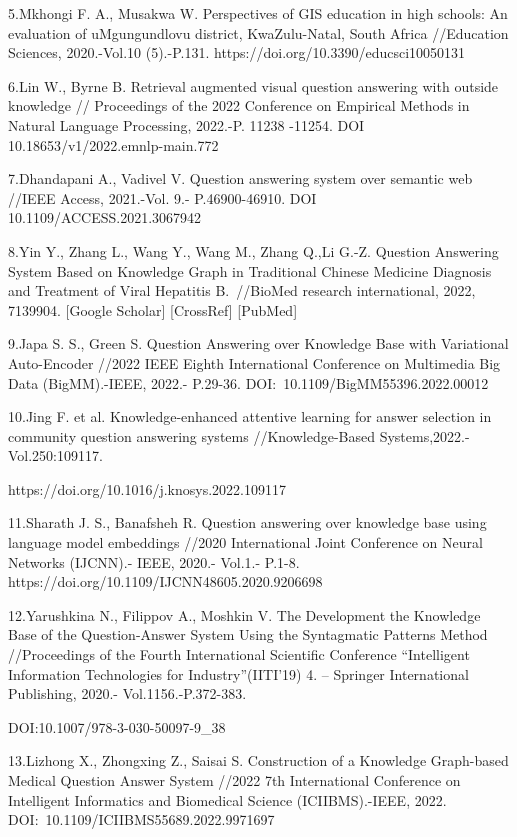 5.Mkhongi F. A., Musakwa W. Perspectives of GIS education in high
schools: An evaluation of uMgungundlovu district, KwaZulu-Natal, South
Africa //Education Sciences, 2020.-Vol.10 (5).-P.131.
https://doi.org/10.3390/educsci10050131

6.Lin W., Byrne B. Retrieval augmented visual question answering with
outside knowledge // Proceedings of the 2022 Conference on Empirical
Methods in Natural Language Processing, 2022.-P. 11238 -11254. DOI
10.18653/v1/2022.emnlp-main.772

7.Dhandapani A., Vadivel V. Question answering system over semantic web
//IEEE Access, 2021.-Vol. 9.- P.46900-46910. DOI
10.1109/ACCESS.2021.3067942

8.Yin Y., Zhang L., Wang Y., Wang M., Zhang Q.,Li G.-Z. Question
Answering System Based on Knowledge Graph in Traditional Chinese
Medicine Diagnosis and Treatment of Viral Hepatitis B.~//BioMed research
international, 2022, 7139904. {[}Google Scholar{]} {[}CrossRef{]}
{[}PubMed{]}

9.Japa S. S., Green S. Question Answering over Knowledge Base with
Variational Auto-Encoder //2022 IEEE Eighth International Conference on
Multimedia Big Data (BigMM).-IEEE, 2022.- P.29-36.
DOI:~10.1109/BigMM55396.2022.00012

10.Jing F. et al. Knowledge-enhanced attentive learning for answer
selection in community question answering systems //Knowledge-Based
Systems,2022.- Vol.250:109117.

https://doi.org/10.1016/j.knosys.2022.109117

11.Sharath J. S., Banafsheh R. Question answering over knowledge base
using language model embeddings //2020 International Joint Conference on
Neural Networks (IJCNN).- IEEE, 2020.- Vol.1.- P.1-8.
https://doi.org/10.1109/IJCNN48605.2020.9206698

12.Yarushkina N., Filippov A., Moshkin V. The Development the Knowledge
Base of the Question-Answer System Using the Syntagmatic Patterns Method
//Proceedings of the Fourth International Scientific Conference
``Intelligent Information Technologies for Industry''(IITI'19) 4. --
Springer International Publishing, 2020.- Vol.1156.-P.372-383.

DOI:10.1007/978-3-030-50097-9\_38

13.Lizhong X., Zhongxing Z., Saisai S. Construction of a Knowledge
Graph-based Medical Question Answer System //2022 7th International
Conference on Intelligent Informatics and Biomedical Science
(ICIIBMS).-IEEE, 2022. DOI:~10.1109/ICIIBMS55689.2022.9971697

